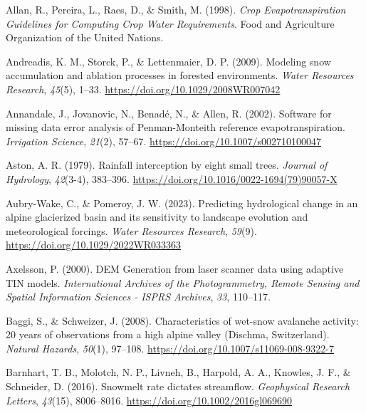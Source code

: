 \documentclass[
  letterpaper,
]{tex/uofsthesis-cs}
\newlength{\cslhangindent}
\newenvironment{CSLReferences}[2] %
 {\begin{list}{}{%
  \setlength{\itemindent}{0pt}
  \setlength{\leftmargin}{0pt}
  \setlength{\parsep}{0pt}
  \ifodd #1
   \setlength{\leftmargin}{\cslhangindent}
   \setlength{\itemindent}{-1\cslhangindent}
  \fi
  \setlength{\itemsep}{#2\baselineskip}}}
 {\end{list}}
\begin{document}

\label{refs}
\begin{CSLReferences}{1}{0}
Allan, R., Pereira, L., Raes, D., \& Smith, M. (1998). \emph{Crop
{Evapotranspiration Guidelines} for {Computing Crop Water
Requirements}}. {Food and Agriculture Organization of the United
Nations}.

Andreadis, K. M., Storck, P., \& Lettenmaier, D. P. (2009). Modeling
snow accumulation and ablation processes in forested environments.
\emph{Water Resources Research}, \emph{45}(5), 1--33.
\url{https://doi.org/10.1029/2008WR007042}

Annandale, J., Jovanovic, N., Benadé, N., \& Allen, R. (2002). Software
for missing data error analysis of {Penman-Monteith} reference
evapotranspiration. \emph{Irrigation Science}, \emph{21}(2), 57--67.
\url{https://doi.org/10.1007/s002710100047}

Aston, A. R. (1979). Rainfall interception by eight small trees.
\emph{Journal of Hydrology}, \emph{42}(3-4), 383--396.
\url{https://doi.org/10.1016/0022-1694(79)90057-X}

Aubry-Wake, C., \& Pomeroy, J. W. (2023). Predicting hydrological change
in an alpine glacierized basin and its sensitivity to landscape
evolution and meteorological forcings. \emph{Water Resources Research},
\emph{59}(9). \url{https://doi.org/10.1029/2022WR033363}

Axelsson, P. (2000). {DEM Generation} from laser scanner data using
adaptive {TIN} models. \emph{International Archives of the
Photogrammetry, Remote Sensing and Spatial Information Sciences -
{ISPRS} Archives}, \emph{33}, 110--117.

Baggi, S., \& Schweizer, J. (2008). Characteristics of wet-snow
avalanche activity: 20 years of observations from a high alpine valley
({Dischma}, {Switzerland}). \emph{Natural Hazards}, \emph{50}(1),
97--108. \url{https://doi.org/10.1007/s11069-008-9322-7}

Barnhart, T. B., Molotch, N. P., Livneh, B., Harpold, A. A., Knowles, J.
F., \& Schneider, D. (2016). Snowmelt rate dictates streamflow.
\emph{Geophysical Research Letters}, \emph{43}(15), 8006--8016.
\url{https://doi.org/10.1002/2016gl069690}


\end{CSLReferences}
\end{document}
